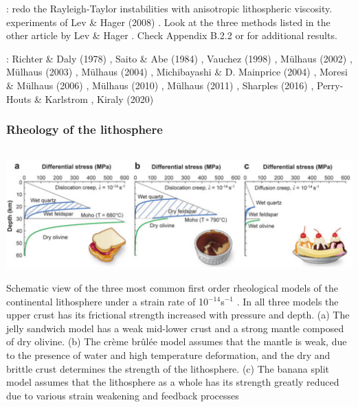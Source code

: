 \mscthesis{}: redo the Rayleigh-Taylor instabilities with 
anisotropic lithospheric viscosity.
experiments of Lev \& Hager (2008) \cite{leha08}. Look at the three methods 
listed in the other article by 
Lev \& Hager \cite{leha08b}. 
Check Appendix B.2.2 or \cite{perr19} for additional results.

\Literature: 
Richter \& Daly (1978) \cite{rida78},
Saito \& Abe (1984) \cite{saab84},
Vauchez \etal (1998) \cite{vatb98},
M{\"u}lhaus \etal (2002) \cite{mumh02},
M{\"u}lhaus \etal (2003) \cite{mumc03},
M{\"u}lhaus \etal (2004) \cite{mumc04},
Michibayashi \& D. Mainprice (2004) \cite{mima04},
Moresi \& M{\"u}lhaus (2006) \cite{momu06},
M{\"u}lhaus \etal (2010) \cite{mumg10},
M{\"u}lhaus \etal (2011) \cite{muso11},
Sharples \etal (2016) \cite{shmv16},
Perry-Houts \& Karlstrom \cite{peka18},
Kiraly \etal (2020) \cite{kich20}

\subsubsection{Rheology of the lithosphere}


\begin{center}
\includegraphics[height=5cm]{images/rheology/budr08}\\
{\captionfont Schematic view of the three most common first order rheological models of the continental 
lithosphere under a strain rate of 10$^{-14}$s$^{-1}$ . 
In all three models the upper crust has its frictional strength increased with pressure and depth. 
(a) The jelly sandwich model has a weak mid-lower crust and a strong mantle composed of dry olivine. 
(b) The cr\`eme br\^ul\'ee model assumes that the mantle is weak, due to the presence of water and high 
temperature deformation, and the dry and brittle crust determines the strength of the lithosphere. 
(c) The banana split model assumes that the lithosphere as a whole has its strength greatly reduced
due to various strain weakening and feedback processes \cite{budr08}}
\end{center}

